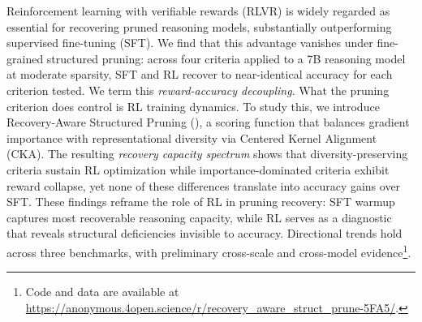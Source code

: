 Reinforcement learning with verifiable rewards (RLVR) is widely regarded as essential for recovering pruned reasoning models, substantially outperforming supervised fine-tuning (SFT). We find that this advantage vanishes under fine-grained structured pruning: across four criteria applied to a 7B reasoning model at moderate sparsity, SFT and RL recover to near-identical accuracy for each criterion tested. We term this \emph{reward-accuracy decoupling}.
What the pruning criterion does control is RL training dynamics. To study this, we introduce Recovery-Aware Structured Pruning (\rasp{}), a scoring function that balances gradient importance with representational diversity via Centered Kernel Alignment (CKA). The resulting \emph{recovery capacity spectrum} shows that diversity-preserving criteria sustain RL optimization while importance-dominated criteria exhibit reward collapse, yet none of these differences translate into accuracy gains over SFT.
These findings reframe the role of RL in pruning recovery: SFT warmup captures most recoverable reasoning capacity, while RL serves as a diagnostic that reveals structural deficiencies invisible to accuracy. Directional trends hold across three benchmarks, with preliminary cross-scale and cross-model evidence\footnote{Code and data are available at \url{https://anonymous.4open.science/r/recovery_aware_struct_prune-5FA5/}.}.
